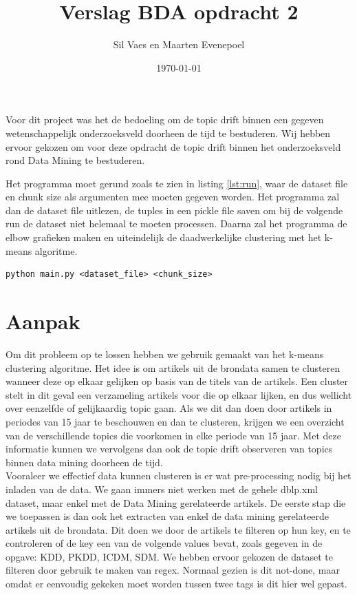 \documentclass[a4paper,fontsize=11pt]{article}
\author{Sil Vaes en Maarten Evenepoel}
\date{\today}
\title{Verslag BDA opdracht 2}
\begin{document}
\maketitle
\setlength\parindent{0pt}

Voor dit project was het de bedoeling om de topic drift binnen een gegeven wetenschappelijk onderzoeksveld doorheen de tijd te bestuderen. Wij hebben ervoor gekozen om voor deze opdracht de topic drift binnen het onderzoeksveld rond Data Mining te bestuderen.

Het programma moet gerund zoals te zien in listing \ref{lst:run}, waar de dataset file en chunk size als argumenten mee moeten gegeven worden.
Het programma zal dan de dataset file uitlezen, de tuples in een pickle file saven om bij de volgende run de dataset niet helemaal te moeten processen.
Daarna zal het programma de elbow grafieken maken en uiteindelijk de daadwerkelijke clustering met het k-means algoritme.

\begin{lstlisting}[caption={KMeans output},label={lst:run},breaklines]
python main.py <dataset_file> <chunk_size>
\end{lstlisting}

\section{Aanpak}

Om dit probleem op te lossen hebben we gebruik gemaakt van het k-means clustering algoritme. Het idee is om artikels uit de brondata samen te clusteren wanneer deze op elkaar gelijken op basis van de titels van de artikels. Een cluster stelt in dit geval een verzameling artikels voor die op elkaar lijken, en dus wellicht over eenzelfde of gelijkaardig topic gaan. Als we dit dan doen door artikels in periodes van 15 jaar te beschouwen en dan te clusteren, krijgen we een overzicht van de verschillende topics die voorkomen in elke periode van 15 jaar. Met deze informatie kunnen we vervolgens dan ook de topic drift observeren van topics binnen data mining doorheen de tijd. \\

Vooraleer we effectief data kunnen clusteren is er wat pre-processing nodig bij het inladen van de data. We gaan immers niet werken met de gehele dblp.xml dataset, maar enkel met de Data Mining gerelateerde artikels. De eerste stap die we toepassen is dan ook het extracten van enkel de data mining gerelateerde artikels uit de brondata. Dit doen we door de artikels te filteren op hun key, en te controleren of de key een van de volgende values bevat, zoals gegeven in de opgave: KDD, PKDD, ICDM, SDM. We hebben ervoor gekozen de dataset te filteren door gebruik te maken van regex. Normaal gezien is dit not-done, maar omdat er eenvoudig gekeken moet worden tussen twee tags is dit hier wel gepast.\\
\end{document}
